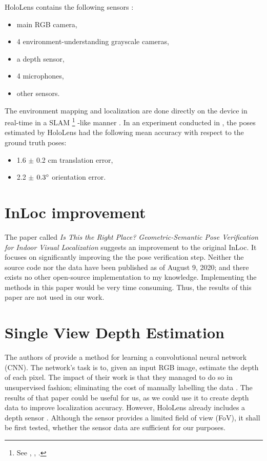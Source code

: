 \documentclass[twoside]{ctuthesis}
\theoremstyle{plain}
\theoremstyle{definition}
\theoremstyle{note}
\begin{document}
HoloLens contains the following sensors \cite{HoloLensEvaluation} \cite{HoloLens1stGen}:

\begin{itemize}
	\item main RGB camera,
	\item 4 environment-understanding grayscale cameras,
	\item a depth sensor,
	\item 4 microphones,
	\item other sensors.
\end{itemize}

The environment mapping and localization are done directly on the device in real-time in a SLAM \footnote{See \cite{SLAM1}, \cite{SLAM2}, \cite{SLAM3}.} -like manner \cite{HoloLensEvaluation}. In an experiment conducted in \cite{HoloLensEvaluation}, the poses estimated by HoloLens had the following mean accuracy with respect to the ground truth poses:

\begin{itemize}
	\item 1.6 $\pm$ 0.2 cm translation error,
	\item 2.2 $\pm$ $0.3\degree$ orientation error.
\end{itemize}

\section{InLoc improvement}
The paper called \emph{Is This the Right Place? Geometric-Semantic Pose Verification for Indoor Visual Localization} \cite{IsThisTheRightPlace} suggests an improvement to the original InLoc. It focuses on significantly improving the the pose verification step. Neither the source code nor the data have been published as of August 9, 2020; and there exists no other open-source implementation to my knowledge. Implementing the methods in this paper would be very time consuming. Thus, the results of this paper are not used in our work.

\section{Single View Depth Estimation}
The authors of \cite{SingleViewDepthEstimation} provide a method for learning a convolutional neural network (CNN). The network's task is to, given an input RGB image, estimate the depth of each pixel. The impact of their work is that they managed to do so in unsupervised fashion; eliminating the cost of manually labelling the data \cite{SingleViewDepthEstimation}. The results of that paper could be useful for us, as we could use it to create depth data to improve localization accuracy. However, HoloLens already includes a depth sensor \cite{HoloLensEvaluation}. Although the sensor provides a limited field of view (FoV), it shall be first tested, whether the sensor data are sufficient for our purposes.
\end{document}
